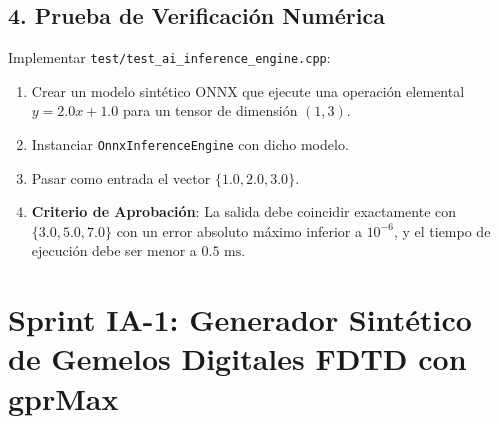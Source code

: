 \documentclass[11pt,a4paper]{article}
\begin{document}
\subsection{4. Prueba de Verificaci{\'o}n Num{\'e}rica}
Implementar \texttt{test/test\_ai\_inference\_engine.cpp}:
\begin{enumerate}
    \item Crear un modelo sint{\'e}tico ONNX que ejecute una operaci{\'o}n elemental $y = 2.0x + 1.0$ para un tensor de dimensi{\'o}n $(1, 3)$.
    \item Instanciar \texttt{OnnxInferenceEngine} con dicho modelo.
    \item Pasar como entrada el vector $\{1.0, 2.0, 3.0\}$.
    \item \textbf{Criterio de Aprobaci{\'o}n}: La salida debe coincidir exactamente con $\{3.0, 5.0, 7.0\}$ con un error absoluto m{\'a}ximo inferior a $10^{-6}$, y el tiempo de ejecuci{\'o}n debe ser menor a $0.5\text{ ms}$.
\end{enumerate}

\newpage

\section{Sprint IA-1: Generador Sint{\'e}tico de Gemelos Digitales FDTD con gprMax}
\end{document}
